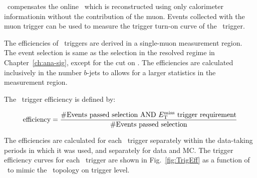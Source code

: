 \par \METnomu~compensates the online \MET~which is reconstructed using only calorimeter informationin without the contribution of the muon.
Events collected with the muon trigger can be used to measure the trigger turn-on curve of the \MET~trigger. 

\par The efficiencies of \MET~triggers are derived in a single-muon measurement region.
The event selection is same as the selection in the resolved regime in Chapter~\ref{ch:ana-sig}, except for the cut on \met.
The efficiencies are calculated inclusively in the number $b$-jets to allows for a larger statistics in the measurement region.


\par The \MET~trigger efficiency is defined by:

\begin{equation}
\label{eq:trigeff}
\text{efficiency} = \frac{\text{\#Events passed selection AND \ensuremath{E_{\mathrm{T}}^{\mathrm{miss}}}~trigger requirement}}{\text{\#Events passed selection}}
\end{equation}

\par The efficiencies are calculated for each \MET~trigger separately within the data-taking periods in which it was used, and separately for data and MC.
 The trigger efficiency curves for each \MET~trigger are shown in Fig.~\ref{fig:TrigEff} as a function of \METnomu~to mimic the \MET~topology on trigger level.


